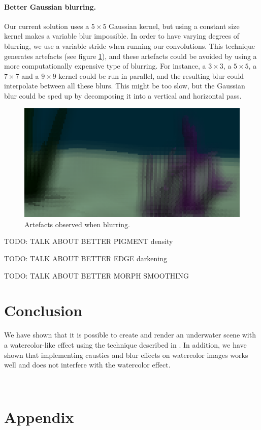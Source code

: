 \documentclass{article}
\begin{document}
\paragraph{Better Gaussian blurring.} Our current solution uses a $5\times5$ Gaussian kernel, but using a constant size kernel makes a variable blur impossible. In order to have varying degrees of blurring, we use a variable stride when running our convolutions. This technique generates artefacts (see figure \ref{fig:blur_artefacts}), and these artefacts could be avoided by using a more computationally expensive type of blurring. For instance, a $3\times3$, a $5\times5$, a $7\times7$ and a $9\times9$ kernel could be run in parallel, and the resulting blur could interpolate between all these blurs. This might be too slow, but the Gaussian blur could be sped up by decomposing it into a vertical and horizontal pass.

\begin{figure}[h]
	\centering
	\includegraphics[width=0.6\columnwidth]{imgs/blur_artefacts.png}
	\hspace{1em}
	\caption{Artefacts observed when blurring.}
	\label{fig:blur_artefacts}
\end{figure}

TODO: TALK ABOUT BETTER PIGMENT density

TODO: TALK ABOUT BETTER EDGE darkening

TODO: TALK ABOUT BETTER MORPH SMOOTHING

\newpage
\section{Conclusion}
We have shown that it is possible to create and render an underwater scene with a watercolor-like effect using the technique described in \cite{watercolor_paper}. In addition, we have shown that implementing caustics and blur effects on watercolor images works well and does not interfere with the watercolor effect.

\newpage~\newpage
\section{Appendix}
\label{sec:appendix}
\end{document}
